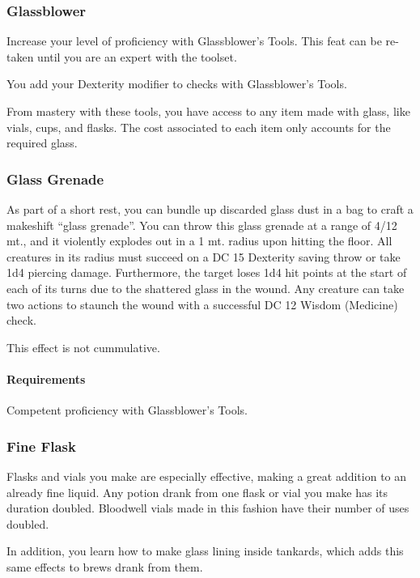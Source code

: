 \subsubsection{Glassblower} \label{feat::glassblower}
    Increase your level of proficiency with Glassblower's Tools.
    This feat can be re-taken until you are an expert with the toolset.

    You add your Dexterity modifier to checks with Glassblower's Tools.

    From mastery with these tools, you have access to any item made with glass, like vials, cups, and flasks.
    The cost associated to each item only accounts for the required glass.

\subsubsection{Glass Grenade} \label{feat::glassgrenade}
    As part of a short rest, you can bundle up discarded glass dust in a bag to craft a makeshift ``glass grenade''.
    You can throw this glass grenade at a range of 4/12 mt., and it violently explodes out in a 1 mt. radius upon hitting the floor.
    All creatures in its radius must succeed on a DC 15 Dexterity saving throw or take 1d4 piercing damage.
    Furthermore, the target loses 1d4 hit points at the start of each of its turns due to the shattered glass in the wound.
    Any creature can take two actions to staunch the wound with a successful DC 12 Wisdom (Medicine) check.

    This effect is not cummulative.
    \paragraph{Requirements} Competent proficiency with Glassblower's Tools.
\subsubsection{Fine Flask} \label{feat::fineflask}
    Flasks and vials you make are especially effective, making a great addition to an already fine liquid.
    Any potion drank from one flask or vial you make has its duration doubled.
    Bloodwell vials made in this fashion have their number of uses doubled.

    In addition, you learn how to make glass lining inside tankards, which adds this same effects to brews drank from them.
